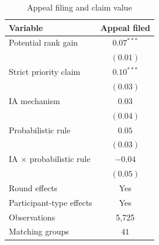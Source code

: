 \begin{table}[htbp]
\centering
\caption{Appeal filing and claim value}
\label{tab:appeal_value_rep}
\begin{tabular}{lc}
\toprule
Variable & Appeal filed \\
\midrule
Potential rank gain & \(0.07^{***}\) \\
& \((0.01)\) \\
Strict priority claim & \(0.10^{***}\) \\
& \((0.03)\) \\
IA mechanism & \(0.03\) \\
& \((0.04)\) \\
Probabilistic rule & \(0.05\) \\
& \((0.03)\) \\
IA \(\times\) probabilistic rule & \(-0.04\) \\
& \((0.05)\) \\
\midrule
Round effects & Yes \\
Participant-type effects & Yes \\
Observations & 5{,}725 \\
Matching groups & \(41\) \\
\bottomrule
\end{tabular}
\end{table}

